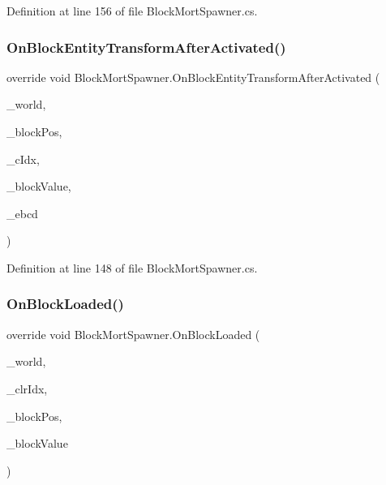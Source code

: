 Definition at line 156 of file Block\+Mort\+Spawner.\+cs.

\mbox{\label{class_block_mort_spawner_a7acaf9899167b5e9b8a6232c00ec578d}} 
\subsubsection{\texorpdfstring{OnBlockEntityTransformAfterActivated()}{OnBlockEntityTransformAfterActivated()}}
{\footnotesize\ttfamily override void Block\+Mort\+Spawner.\+On\+Block\+Entity\+Transform\+After\+Activated (\begin{DoxyParamCaption}\item[{World\+Base}]{\+\_\+world,  }\item[{Vector3i}]{\+\_\+block\+Pos,  }\item[{int}]{\+\_\+c\+Idx,  }\item[{Block\+Value}]{\+\_\+block\+Value,  }\item[{Block\+Entity\+Data}]{\+\_\+ebcd }\end{DoxyParamCaption})}



Definition at line 148 of file Block\+Mort\+Spawner.\+cs.

\mbox{\label{class_block_mort_spawner_afa7ad4a7e5450bb9dccec012471cb1e9}} 
\subsubsection{\texorpdfstring{OnBlockLoaded()}{OnBlockLoaded()}}
{\footnotesize\ttfamily override void Block\+Mort\+Spawner.\+On\+Block\+Loaded (\begin{DoxyParamCaption}\item[{World\+Base}]{\+\_\+world,  }\item[{int}]{\+\_\+clr\+Idx,  }\item[{Vector3i}]{\+\_\+block\+Pos,  }\item[{Block\+Value}]{\+\_\+block\+Value }\end{DoxyParamCaption})}



